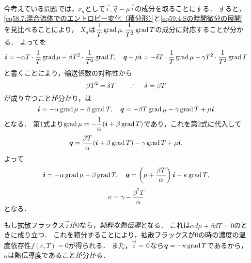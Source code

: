 今考えている問題では，$\dot{x_a}$として$\vec{i}, \vec{q}-\mu\vec{i}$の成分を取ることにする．
すると，\eqref{eq58.7:混合流体でのエントロピー変化（積分形）}と\eqref{eq59.4:Sの時間微分の展開}を見比べることにより，
$X_a$は$\dfrac{1}{T} \operatorname{grad}\mu, \dfrac{1}{T^2} \operatorname{grad} T$の成分に対応することが分かる．
よってを
\[
    \vb*{i} = -\alpha T \cdot \frac{1}{T} \operatorname{grad} \mu - \beta T^2 \cdot \frac{1}{T^2} \operatorname{grad} T, \quad 
    \vb*{q}-\mu\vb*{i} = - \delta T \cdot \frac{1}{T} \operatorname{grad} \mu - \gamma T^2 \cdot \frac{1}{T^2} \operatorname{grad} T 
\]
と書くことにより，輸送係数の対称性から
\[
    \beta T^2 = \delta T 
    \qquad \therefore\quad \delta = \beta T
\]
が成り立つことが分かり，は
\begin{equation}
    \vb*{i} = -\alpha \operatorname{grad} \mu - \beta \operatorname{grad} T, \quad 
    \vb*{q} = - \beta T \operatorname{grad} \mu - \gamma \operatorname{grad} T + \mu\vb*{i}
\end{equation}
となる．
第1式より$\operatorname{grad} \mu = - \dfrac{1}{\alpha}(\vb*{i} + \beta \operatorname{grad} T)$であり，これを第2式に代入して
\[
    \vb*{q} = \frac{\beta T}{\alpha}(\vb*{i} + \beta \operatorname{grad} T) - \gamma \operatorname{grad} T + \mu\vb*{i}.
\]
よって
\begin{equation}\label{eq59.6:iとqの展開}
    \vb*{i} = -\alpha \operatorname{grad} \mu - \beta \operatorname{grad} T, \quad
    \vb*{q} = \left( \mu + \frac{\beta T}{\alpha} \right) \vb*{i} - \kappa \operatorname{grad} T ,
\end{equation}
\begin{equation}
    \kappa = \gamma - \frac{\beta^2 T}{\alpha}
\end{equation}
となる．


もし拡散フラックス$\vec{i}$が0なら，\emph{純粋な熱伝導}となる．
これは$\alpha d\mu + \beta dT =0$のときに成り立つ．
これを積分することにより，拡散フラックスが0の時の濃度の温度依存性$f(c, T)=0$が得られる．
また，$\vec{i}=\vec{0}$なら$\vb*{q}= -\kappa \operatorname{grad} T$であるから，$\kappa$は熱伝導度であることが分かる．



